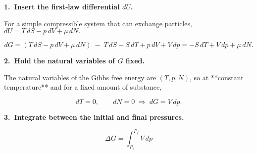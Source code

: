 \documentclass[12pt]{article}
\theoremstyle{definition} %
\theoremstyle{plain} %
\begin{document}
                    \textbf{1.\ Insert the first‑law differential \(dU\).}
                    
                    For a simple compressible system that can exchange particles,  
                    \(dU = T\,dS - p\,dV + \mu\,dN.\)
                    
                    \[
                    dG = (T\,dS - p\,dV + \mu\,dN)\;-\;T\,dS - S\,dT + p\,dV + V\,dp
                        = -S\,dT + V\,dp + \mu\,dN. \tag{2}
                    \]
                    
                    \textbf{2.\ Hold the natural variables of \(G\) fixed.}
                    
                    The natural variables of the Gibbs free energy are \((T,p,N)\), so at **constant temperature** and for a fixed amount of substance,
                    
                    \[
                    dT = 0,\qquad dN = 0
                    \;\Longrightarrow\;
                    dG = V\,dp. \tag{3}
                    \]
                    
                    \textbf{3.\ Integrate between the initial and final pressures.}
                    
                    \[
                    \boxed{\;
                    \Delta G
                      = \int_{P_i}^{P_f} V\,dp
                    \;}
                    \tag{4}
                    \]
                    
\end{document}
